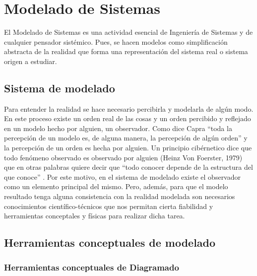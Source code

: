 
\chapter{Modelado de Sistemas}

El Modelado de Sistemas es una actividad esencial de Ingeniería de Sistemas y de cualquier pensador sistémico. Pues, se hacen modelos como simplificación abstracta de la realidad \cite{Meadows-2009} que forma una representación del sistema real \cite{Fiuba-2005} o sistema origen a estudiar.

\section{Sistema de modelado}

Para entender la realidad se hace necesario percibirla y modelarla de algún modo. En este proceso existe un orden real de las cosas y un orden percibido y reflejado en un modelo hecho por alguien, un observador. Como dice Capra “toda la percepción de un modelo es, de alguna manera, la percepción de algún orden” \cite{Fritjof-Capra-1975} y la percepción de un orden es hecha por alguien. Un principio cibérnetico dice que todo fenómeno observado es observado por alguien (Heinz Von Foerster, 1979) que en otras palabras quiere decir que “todo conocer depende de la estructura del que conoce” \cite{Maturana-1984}. Por este motivo, en el sistema de modelado existe el observador como un elemento principal del mismo. Pero, además, para que el modelo resultado tenga alguna consistencia con la realidad modelada son necesarios conocimientos científico-técnicos que nos permitan cierta fiabilidad y herramientas conceptales y físicas para realizar dicha tarea.

\section{Herramientas conceptuales de modelado}

\subsection{Herramientas conceptuales de Diagramado}


